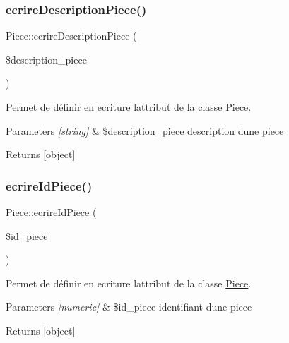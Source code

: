 \subsubsection{\texorpdfstring{ecrire\+Description\+Piece()}{ecrireDescriptionPiece()}}
{\footnotesize\ttfamily Piece\+::ecrire\+Description\+Piece (\begin{DoxyParamCaption}\item[{}]{\$description\+\_\+piece }\end{DoxyParamCaption})}



Permet de définir en ecriture l\textquotesingle{}attribut de la classe \hyperlink{class_piece}{Piece}. 


\begin{DoxyParams}{Parameters}
{\em \mbox{[}string\mbox{]}} & \$description\+\_\+piece description d\textquotesingle{}une piece \\
\hline
\end{DoxyParams}
\begin{DoxyReturn}{Returns}
\mbox{[}object\mbox{]} 
\end{DoxyReturn}
\mbox{\label{class_piece_a6ad3e247640cd544ae853dfd19b7c42c}} 
\subsubsection{\texorpdfstring{ecrire\+Id\+Piece()}{ecrireIdPiece()}}
{\footnotesize\ttfamily Piece\+::ecrire\+Id\+Piece (\begin{DoxyParamCaption}\item[{}]{\$id\+\_\+piece }\end{DoxyParamCaption})}



Permet de définir en ecriture l\textquotesingle{}attribut de la classe \hyperlink{class_piece}{Piece}. 


\begin{DoxyParams}{Parameters}
{\em \mbox{[}numeric\mbox{]}} & \$id\+\_\+piece identifiant d\textquotesingle{}une piece \\
\hline
\end{DoxyParams}
\begin{DoxyReturn}{Returns}
\mbox{[}object\mbox{]} 
\end{DoxyReturn}
\mbox{\label{class_piece_aeccf1ee3ec25e01d6f7ce7068f8397b4}} 
